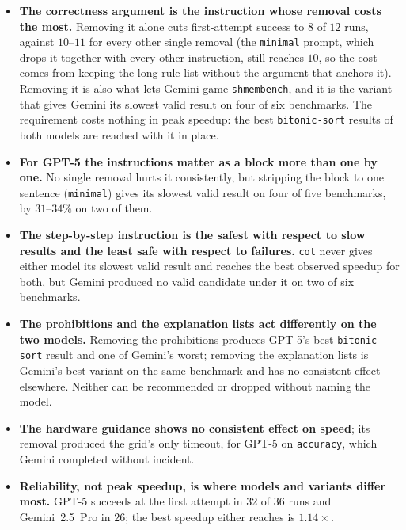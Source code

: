 \begin{itemize}\itemsep2pt
  \item \textbf{The correctness argument is the instruction whose removal costs the most.} Removing
    it alone cuts first-attempt success to $8$ of $12$ runs, against $10$--$11$ for every other single
    removal (the \texttt{minimal} prompt, which drops it together with every other instruction,
    still reaches $10$, so the cost comes from keeping the long rule list without the argument that
    anchors it). Removing it is also what lets Gemini game \texttt{shmembench}, and it is the variant
    that gives Gemini its slowest valid result on four of six benchmarks. The requirement costs nothing
    in peak speedup: the best \texttt{bitonic-sort} results of both models are reached with it in
    place.
  \item \textbf{For GPT-5 the instructions matter as a block more than one by one.} No single removal
    hurts it consistently, but stripping the block to one sentence (\texttt{minimal}) gives its slowest
    valid result on four of five benchmarks, by $31$--$34\%$ on two of them.
  \item \textbf{The step-by-step instruction is the safest with respect to slow results and the least
    safe with respect to failures.} \texttt{cot} never gives either model its slowest valid result and
    reaches the best observed speedup for both, but Gemini produced no valid candidate under it on two
    of six benchmarks.
  \item \textbf{The prohibitions and the explanation lists act differently on the two models.}
    Removing the prohibitions produces GPT-5's best \texttt{bitonic-sort} result and one of Gemini's
    worst; removing the explanation lists is Gemini's best variant on the same benchmark and has no
    consistent effect elsewhere. Neither can be recommended or dropped without naming the model.
  \item \textbf{The hardware guidance shows no consistent effect on speed}; its removal produced the
    grid's only timeout, for GPT-5 on \texttt{accuracy}, which Gemini completed without incident.
  \item \textbf{Reliability, not peak speedup, is where models and variants differ most.} GPT-5
    succeeds at the first attempt in $32$ of $36$ runs and Gemini~2.5~Pro in $26$; the best speedup
    either reaches is $1.14\times$.
\end{itemize}

